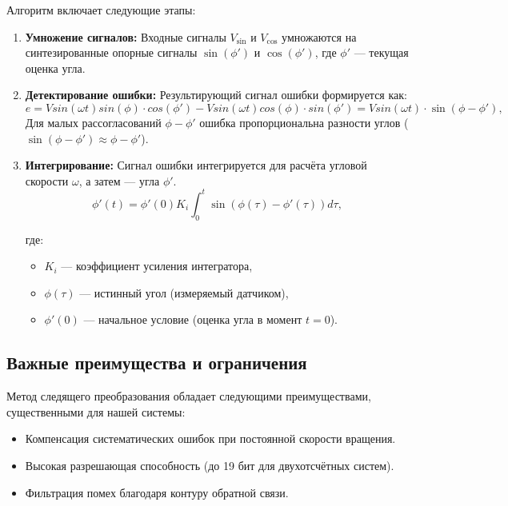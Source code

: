 Алгоритм включает следующие этапы:
\begin{enumerate}
    \item \textbf{Умножение сигналов:} Входные сигналы \( V_{\text{sin}} \) и \( V_{\text{cos}} \) умножаются на синтезированные опорные сигналы \( \sin(\phi') \) и \( \cos(\phi') \), где \( \phi' \) — текущая оценка угла. 
    \item \textbf{Детектирование ошибки:} Результирующий сигнал ошибки формируется как: 
    \begin{equation}
      e = V sin(\omega t) sin(\phi) \cdot cos(\phi') - V sin(\omega t) cos(\phi) \cdot sin(\phi') = V sin(\omega t) \cdot \sin(\phi - \phi'),
      \label{eq:error}
    \end{equation}
    Для малых рассогласований \( \phi - \phi' \) ошибка пропорциональна разности углов ($\sin(\phi - \phi') \approx \phi - \phi'$).
    \item \textbf{Интегрирование:} Сигнал ошибки интегрируется для расчёта угловой скорости \( \omega \), а затем — угла \( \phi' \). 
    \begin{equation}
      \phi'(t) = \phi'(0) K_i \int_0^t \sin\left(\phi(\tau) - \phi'(\tau)\right) d\tau, 
      \label{eq:phi_prime}
    \end{equation}
      
      где:
    \begin{itemize}
        \item \(K_i\) — коэффициент усиления интегратора,
        \item \(\phi(\tau)\) — истинный угол (измеряемый датчиком),
        \item \(\phi'(0)\) — начальное условие (оценка угла в момент \(t=0\)).
    \end{itemize}


\end{enumerate}

\subsection{ Важные преимущества и ограничения}
Метод следящего преобразования обладает следующими преимуществами, существенными для нашей системы:
\begin{itemize}
    \item Компенсация систематических ошибок при постоянной скорости вращения.
    \item Высокая разрешающая способность (до 19 бит для двухотсчётных систем).
    \item Фильтрация помех благодаря контуру обратной связи.
\end{itemize}

